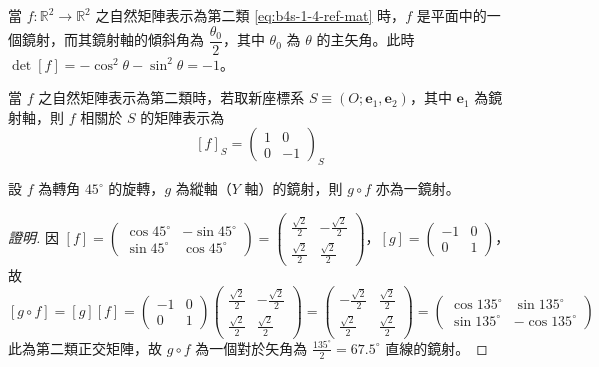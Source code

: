 \begin{proposition}[命題 8]
當 $f: \mathbb{R}^2 \to \mathbb{R}^2$ 之自然矩陣表示為第二類 \eqref{eq:b4s-1-4-ref-mat} 時，$f$ 是平面中的一個鏡射，而其鏡射軸的傾斜角為 $\dfrac{\theta_0}{2}$，其中 $\theta_0$ 為 $\theta$ 的主矢角。此時 $\det[f] = -\cos^2\theta - \sin^2\theta = -1$。
\end{proposition}

\begin{proposition}[命題 9]
當 $f$ 之自然矩陣表示為第二類時，若取新座標系 $S \equiv (O; \mathbf{e}_1, \mathbf{e}_2)$，其中 $\mathbf{e}_1$ 為鏡射軸，則 $f$ 相關於 $S$ 的矩陣表示為
\[ [f]_S = \begin{pmatrix} 1 & 0 \\ 0 & -1 \end{pmatrix}_S \]
\end{proposition}

\begin{example}[論例 3]
設 $f$ 為轉角 $45^\circ$ 的旋轉，$g$ 為縱軸（$Y$ 軸）的鏡射，則 $g \circ f$ 亦為一鏡射。
\end{example}

\begin{proof}[證明]
因 $[f] = \begin{pmatrix} \cos 45^\circ & -\sin 45^\circ \\ \sin 45^\circ & \cos 45^\circ \end{pmatrix} = \begin{pmatrix} \frac{\sqrt{2}}{2} & -\frac{\sqrt{2}}{2} \\ \frac{\sqrt{2}}{2} & \frac{\sqrt{2}}{2} \end{pmatrix}$，$[g] = \begin{pmatrix} -1 & 0 \\ 0 & 1 \end{pmatrix}$，故
\[ [g \circ f] = [g][f] = \begin{pmatrix} -1 & 0 \\ 0 & 1 \end{pmatrix} \begin{pmatrix} \frac{\sqrt{2}}{2} & -\frac{\sqrt{2}}{2} \\ \frac{\sqrt{2}}{2} & \frac{\sqrt{2}}{2} \end{pmatrix} = \begin{pmatrix} -\frac{\sqrt{2}}{2} & \frac{\sqrt{2}}{2} \\ \frac{\sqrt{2}}{2} & \frac{\sqrt{2}}{2} \end{pmatrix} = \begin{pmatrix} \cos 135^\circ & \sin 135^\circ \\ \sin 135^\circ & -\cos 135^\circ \end{pmatrix} \]
此為第二類正交矩陣，故 $g \circ f$ 為一個對於矢角為 $\frac{135^\circ}{2} = 67.5^\circ$ 直線的鏡射。
\end{proof}

